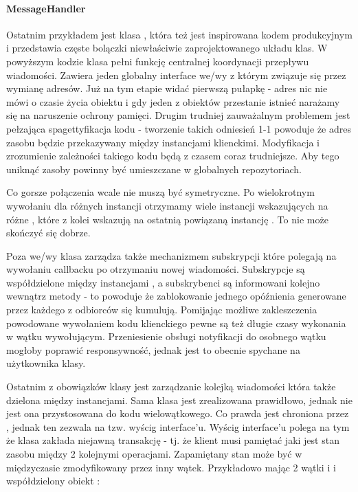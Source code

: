 \paragraph{MessageHandler}
Ostatnim przykładem jest klasa , która też jest inspirowana kodem produkcyjnym i przedstawia częste bolączki niewłaściwie zaprojektowanego układu klas.
W powyższym kodzie klasa  pełni funkcję centralnej koordynacji przepływu wiadomości. Zawiera jeden globalny interface we/wy  z którym związuje się przez wymianę adresów. Już na tym etapie widać pierwszą pułapkę - adres nic nie mówi o czasie życia obiektu i gdy jeden z obiektów przestanie istnieć narażamy się na naruszenie ochrony pamięci. Drugim trudniej zauważalnym problemem jest pełzająca spagettyfikacja kodu - tworzenie takich odniesień 1-1 powoduje że adres zasobu będzie przekazywany między instancjami klienckimi. Modyfikacja i zrozumienie zależności takiego kodu będą z czasem coraz trudniejsze. Aby tego uniknąć zasoby powinny być umieszczane w globalnych repozytoriach.

Co gorsze połączenia wcale nie muszą być symetryczne. Po wielokrotnym wywołaniu  dla różnych instancji  otrzymamy wiele instancji  wskazujących na różne , które z kolei wskazują na ostatnią powiązaną instancję . To nie może skończyć się dobrze.

Poza we/wy klasa  zarządza także mechanizmem subskrypcji które polegają na wywołaniu callbacku po otrzymaniu nowej wiadomości. Subskrypcje są współdzielone między instancjami , a subskrybenci są informowani kolejno wewnątrz metody  - to powoduje że zablokowanie jednego opóźnienia generowane przez każdego z odbiorców się kumulują. Pomijając możliwe zakleszczenia powodowane wywołaniem kodu klienckiego pewne są też długie czasy wykonania w wątku wywołującym. Przeniesienie obsługi notyfikacji do osobnego wątku mogłoby poprawić responsywność, jednak jest to obecnie spychane na użytkownika klasy.

Ostatnim z obowiązków klasy  jest zarządzanie kolejką wiadomości która także dzielona między instancjami. Sama klasa  jest zrealizowana prawidłowo, jednak nie jest ona przystosowana do kodu wielowątkowego. Co prawda  jest chroniona przez , jednak ten zezwala na tzw. wyścig interface'u. Wyścig interface'u polega na tym że klasa zakłada niejawną transakcję - tj. że klient musi pamiętać jaki jest stan zasobu między 2 kolejnymi operacjami. Zapamiętany stan może być w międzyczasie zmodyfikowany przez inny wątek. Przykładowo mając 2 wątki  i  i współdzielony obiekt :

